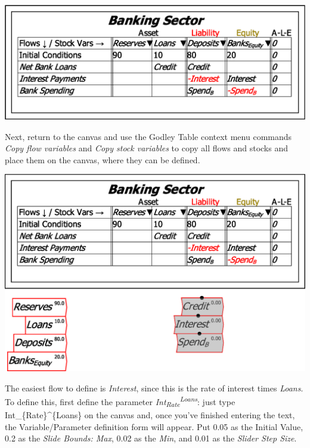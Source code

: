 \noindent\includegraphics[width=\textwidth]{images/MonetaryModel01GodleyTable04AddFlows}

Next, return to the canvas and use the Godley Table context menu commands
\emph{Copy flow variables} and \emph{Copy stock variables} to copy
all flows and stocks and place them on the canvas, where they can
be defined.

\noindent\includegraphics[width=\textwidth]{images/MonetaryModel01GodleyTable05DefineFlows01}

The easiest flow to define is \emph{Interest}, since this is the rate
of interest times \emph{Loans}. To define this, first define the parameter
\emph{Int}\textsubscript{\emph{Rate}}\emph{}\textsuperscript{\emph{Loans}}:
just type Int\_\{Rate\}\textasciicircum\{Loans\} on the canvas and,
once you've finished entering the text, the Variable/Parameter definition
form will appear. Put 0.05 as the Initial Value, 0.2 as the \emph{Slide
Bounds: Max}, 0.02 as the \emph{Min}, and 0.01 as the \emph{Slider
Step Size}.

